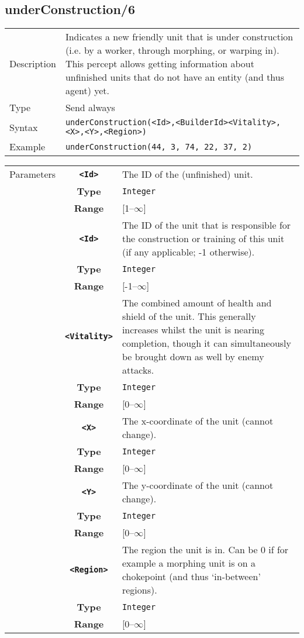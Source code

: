 \subsection{underConstruction/6}
\begin{tabularx}{\textwidth}{lX}
 Description & Indicates a new friendly unit that is under construction (i.e. by a worker, through morphing, or warping in). This percept allows getting information about unfinished units that do not have an entity (and thus agent) yet. \\
 Type & Send always \\
 Syntax & \verb|underConstruction(<Id>,<BuilderId><Vitality>,<X>,<Y>,<Region>)| \\
 Example & \verb|underConstruction(44, 3, 74, 22, 37, 2)|   \\
 \end{tabularx}
 \begin{tabularx}{\textwidth}{l | c | p{8cm}|}
 \cline{2-3}
 Parameters & \textbf{\verb|<Id>|} & The ID of the (unfinished) unit.\\
            & \textbf{Type} & \verb|Integer| \\
            & \textbf{Range} & [1--$\infty$] \\
            \cline{2-3}
            & \textbf{\verb|<Id>|} & The ID of the unit that is responsible for the construction or training of this unit (if any applicable; -1 otherwise).\\
            & \textbf{Type} & \verb|Integer| \\
            & \textbf{Range} & [-1--$\infty$] \\
            \cline{2-3}
            & \textbf{\verb|<Vitality>|} & The combined amount of health and shield of the unit. This generally increases whilst the unit is nearing completion, though it can simultaneously be brought down as well by enemy attacks.\\
            & \textbf{Type} & \verb|Integer| \\
            & \textbf{Range} & [0--$\infty$] \\
            \cline{2-3}
            & \textbf{\verb|<X>|} & The x-coordinate of the unit (cannot change). \\
            & \textbf{Type} & \verb|Integer| \\
            &\textbf{Range} &  [0--$\infty$] \\
            \cline{2-3}
            & \textbf{\verb|<Y>|} & The y-coordinate of the unit (cannot change). \\
            & \textbf{Type} & \verb|Integer| \\
            &\textbf{Range} & [0--$\infty$] \\
            \cline{2-3}
            & \textbf{\verb|<Region>|} & The region the unit is in. Can be 0 if for example a morphing unit is on a chokepoint (and thus `in-between' regions).\\
            & \textbf{Type} & \verb|Integer| \\
            & \textbf{Range} & [0--$\infty$] \\
            \cline{2-3}
\end{tabularx}

